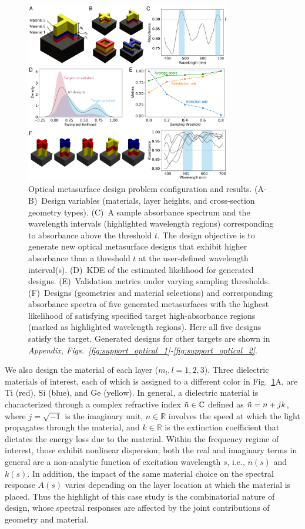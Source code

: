 \documentclass{article}
\begin{document}
\begin{figure}[h]
\centering
\includegraphics[width=0.8\textwidth]{fig/optical.pdf}
\caption{Optical metasurface design problem configuration and results. (A-B)~Design variables (materials, layer heights, and cross-section geometry types). (C)~A sample absorbance spectrum and the wavelength intervals (highlighted wavelength regions) corresponding to absorbance above the threshold $t$. The design objective is to generate new optical metasurface designs that exhibit higher absorbance than a threshold $t$ at the user-defined wavelength interval(s). (D)~KDE of the estimated likelihood for generated designs. (E)~Validation metrics under varying sampling thresholds. (F)~Designs (geometries and material selections) and corresponding absorbance spectra of five generated metasurfaces with the highest likelihood of satisfying specified target high-absorbance regions (marked as highlighted wavelength regions). Here all five designs satisfy the target. Generated designs for other targets are shown in \textit{Appendix, Figs.~\ref{fig:support_optical_1}-\ref{fig:support_optical_2}}.
}
\label{fig:optical}
\end{figure}

We also design the material of each layer ($m_l, l=1, 2, 3$). Three dielectric materials of interest, each of which is assigned to a different color in Fig.~\ref{fig:optical}A, are Ti (red), Si (blue), and Ge (yellow). In general, a dielectric material is characterized through a complex refractive index $ \Tilde{n} \in \mathbb{C}$ defined as $\Tilde{n} = n + j k$, where $j=\sqrt{-1}$ is the imaginary unit, $n\in\mathbb{R}$ involves the speed at which the light propagates through the material, and $k\in\mathbb{R}$ is the extinction coefficient that dictates the energy loss due to the material.
Within the frequency regime of interest, those exhibit nonlinear dispersion; both the real and imaginary terms in general are a non-analytic function of excitation wavelength $s$, i.e., $n(s)$ and $k(s)$. In addition, the impact of the same material choice on the spectral response $A(s)$ varies depending on the layer location at which the material is placed. Thus the highlight of this case study is the combinatorial nature of design, whose spectral responses are affected by the joint contributions of geometry and material.
\end{document}
